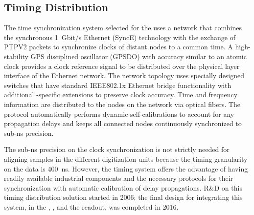 \subsection{Timing Distribution}
\label{ssec:dp-tpcelec-wr}
The time synchronization system selected for the  uses a  network  that combines the synchronous \SI{1}{Gbit/s} Ethernet (SyncE) technology with the exchange of PTPV2 packets  to synchronize clocks of distant nodes to a common time. A high-stability GPS disciplined oscillator (GPSDO) with  accuracy similar to an atomic clock provides a clock reference signal to be distributed over the physical layer interface of the  Ethernet network. The network topology uses specially designed switches that have standard IEEE802.1x Ethernet bridge functionality with additional -specific extensions to preserve clock accuracy. Time and frequency information are distributed to the nodes on the  network via optical fibers. The  protocol automatically performs dynamic self-calibrations to account for any propagation delays and keeps all connected nodes continuously synchronized to sub-\si{\nano\second} precision. 

The  sub-\si{\nano\second} precision on the clock synchronization is not strictly needed for aligning samples in the different  digitization units because the timing granularity on the data is \SI{400}{ns}. However, the  timing system offers the advantage of having readily available industrial components and the necessary protocols for their synchronization with automatic calibration of delay propagations. R\&D on this timing distribution solution started in 2006; the final design for integrating this system, in the , , and the  readout, was completed in 2016. 

